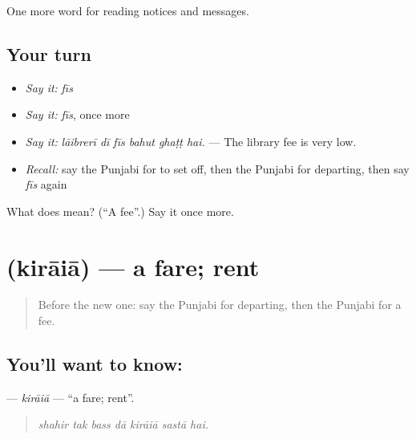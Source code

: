 \begin{grammarlens}[title={What you've built}]
One more word for reading notices and messages.
\end{grammarlens}

\subsection*{Your turn}
\begin{itemize}
\raggedright
  \item \emph{Say it:} \emph{fīs}
  \item \emph{Say it:} \emph{fīs}, once more
  \item \emph{Say it:} \emph{lāibrerī dī fīs bahut ghaṭṭ hai.} — The library fee is very low.
  \item \emph{Recall:} say the Punjabi for to set off, then the Punjabi for departing, then say \emph{fīs} again
\end{itemize}

\begin{tcolorbox}[breakable,colback=teal!4,colframe=teal!35!black,title={Before you move on}]
What does  mean? (\textquotedblleft{}A fee\textquotedblright{}.) Say it once more.
\end{tcolorbox}
\section[\texorpdfstring{\pa{ਕਿਰਾਇਆ} (kirāiā)}{ਕਿਰਾਇਆ (kirāiā)}]{ (kirāiā) — a fare; rent}

\label{lesson:PA-C262-kiraia}



\begin{quote}
Before the new one: say the Punjabi for departing, then the Punjabi for a fee.
\end{quote}

\subsection*{You'll want to know: }
\textbf{} — \emph{kirāiā} — \textquotedblleft{}a fare; rent\textquotedblright{}.

\begin{quote}
      
\end{quote}

\begin{quote}
\emph{shahir tak bass dā kirāiā sastā hai.}
\end{quote}

